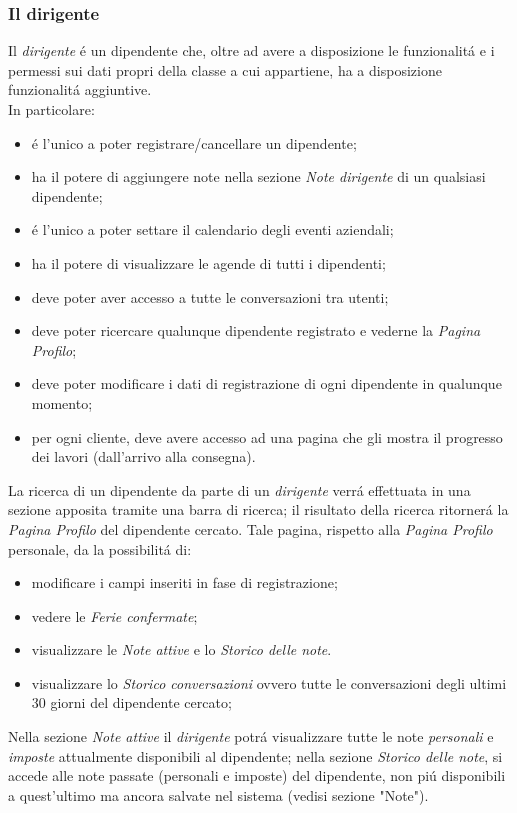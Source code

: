 \documentclass[paper=a4, fontsize=11pt]{scrartcl} %
\numberwithin{equation}{section} %
\numberwithin{figure}{section} %
\numberwithin{table}{section} %
\begin{document}
\subsubsection{Il dirigente}
Il \textit{dirigente} \'e un dipendente che, oltre ad avere a disposizione le funzionalit\'a e i permessi sui dati
propri della classe a cui appartiene, ha a disposizione funzionalit\'a aggiuntive.\\
In particolare:
\begin{itemize}
    \item \'e l'unico a poter registrare/cancellare un dipendente;
    \item ha il potere di aggiungere note nella sezione \textit{Note dirigente} di un qualsiasi dipendente;
    \item \'e l'unico a poter settare il calendario degli eventi aziendali;
    \item ha il potere di visualizzare le agende di tutti i dipendenti;
    \item deve poter aver accesso a tutte le conversazioni tra utenti;
    \item deve poter ricercare qualunque dipendente registrato e vederne la \textit{Pagina Profilo};
    \item deve poter modificare i dati di registrazione di ogni dipendente in qualunque momento;
    \item per ogni cliente, deve avere accesso ad una pagina che gli mostra il progresso dei lavori (dall'arrivo alla consegna).
\end{itemize}

La ricerca di un dipendente da parte di un \textit{dirigente} verr\'a effettuata in una sezione apposita tramite una
barra di ricerca; il risultato della ricerca ritorner\'a la \textit{Pagina Profilo} del dipendente cercato.
Tale pagina, rispetto alla \textit{Pagina Profilo} personale, da la possibilit\'a di:
\begin{itemize}
 \item modificare i campi inseriti in fase di registrazione;
 \item vedere le \textit{Ferie confermate};
 \item visualizzare le \textit{Note attive} e  lo \textit{Storico delle note}.
 \item visualizzare lo \textit{Storico conversazioni} ovvero tutte le conversazioni degli ultimi 30 giorni
    del dipendente cercato;
\end{itemize}

Nella sezione \textit{Note attive} il \textit{dirigente} potr\'a visualizzare tutte
le note \textit{personali} e \textit{imposte} attualmente disponibili al dipendente; nella sezione
\textit{Storico delle note}, si accede alle note passate (personali e imposte) del dipendente, non pi\'u disponibili
a quest'ultimo ma ancora salvate nel sistema (vedisi sezione "Note").
\end{document}
